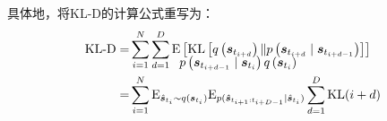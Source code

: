具体地，将KL-D的计算公式重写为：
\begin{equation}
\begin{aligned}
\text{KL-D}=&\sum_{i=1}^{N}\sum_{d=1}^{D}\mathrm{E}\left[\operatorname{KL}\left[q\left(\boldsymbol{s}_{t_{i+d}} \right) \| p\left(\boldsymbol{s}_{t_{i+d}} \mid \boldsymbol{s}_{t_{i+d-1}}\right)\right]\right]\\[-15pt]
&\hspace{40pt}\small{p\left(\boldsymbol{s}_{t_{i+d-1}} \mid\boldsymbol{s}_{t_{i}}\right){q\left(\boldsymbol{s}_{t_{i}} \right)}}\\
=&\sum_{i=1}^{N}\mathrm{E}_{\hat{\boldsymbol{s}}_{t_i}\sim q(\boldsymbol{s}_{t_{i}})}\mathrm{E}_{p(\boldsymbol{\hat{s}}_{t_{i+1}:t_{i+D-1}}\mid \hat{\boldsymbol{s}}_{t_i})}\sum_{d=1}^{D}\operatorname{KL}(i+d)\\
\end{aligned}
\label{equ:reuse}
\end{equation}
